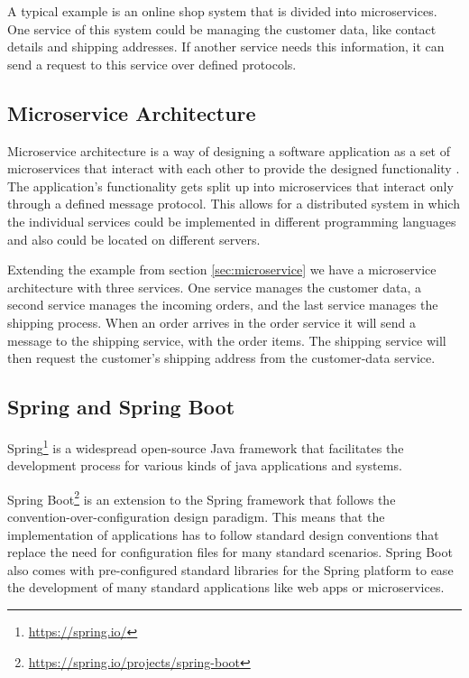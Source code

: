 A typical example is an online shop system that is divided into microservices.
One service of this system could be managing the customer data, like contact details and shipping addresses.
If another service needs this information, it can send a request to this service over defined protocols.


\subsection{Microservice Architecture}
\label{sec:microservice_architecture}
Microservice architecture is a way of designing a software application as a set of microservices that interact with each other to provide the designed functionality \cite{dragoniMicroservicesYesterdayToday2017, MicroservicesRetrievedJan}.
The application's functionality gets split up into microservices that interact only through a defined message protocol.
This allows for a distributed system in which the individual services could be implemented in different programming languages and also could be located on different servers.

Extending the example from section \ref{sec:microservice} we have a microservice architecture with three services.
One service manages the customer data, a second service manages the incoming orders, and the last service manages the shipping process.
When an order arrives in the order service it will send a message to the shipping service, with the order items.
The shipping service will then request the customer's shipping address from the customer-data service.


\subsection{Spring and Spring Boot}
\label{sec:spring}
Spring\footnote{\url{https://spring.io/}} is a widespread open-source Java framework that facilitates the development process for various kinds of java applications and systems.

Spring Boot\footnote{\url{https://spring.io/projects/spring-boot}} is an extension to the Spring framework that follows the convention-over-configuration design paradigm.
This means that the implementation of applications has to follow standard design conventions that replace the need for configuration files for many standard scenarios.
Spring Boot also comes with pre-configured standard libraries for the Spring platform to ease the development of many standard applications like web apps or microservices.

